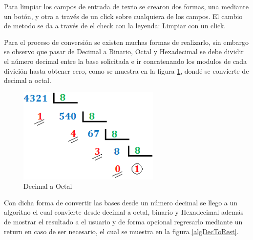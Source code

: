\documentclass[letterpaper,12pt]{extarticle}%
\begin{document}
		Para limpiar los campos de entrada de texto se crearon dos formas, una mediante
		un botón, y otra a través de un click sobre cualquiera de los campos. El cambio de 
		metodo se da a través de el check con la leyenda: Limpiar con un click.
		
		Para el proceso de conversión se existen muchas formas de realizarlo, sin embargo
		se observo que pasar de Decimal a Binario, Octal y Hexadecimal se debe dividir el número
		decimal entre la base solicitada e ir concatenando los modulos de cada divición
		hasta obtener cero, como se muestra en la figura \ref{decToOct}, dondé se convierte de decimal
		a octal.

		\begin{figure}[H]
		\begin{center}
		\includegraphics[width=7cm]{imag//decimalToOctal.png}
		\caption{Decimal a Octal}
		\label{decToOct}
		\end{center}
		\end{figure}

		Con dicha forma de convertir las bases desde un número decimal se llego a un algoritno el cual
		convierte desde decimal a octal, binario y Hexadecimal además de mostrar el resultado a el usuario
		y de forma opcional regresarlo mediante un return en caso de ser necesario, el cual se muestra en la 
		figura \ref{algDecToRest}.
\end{document}
